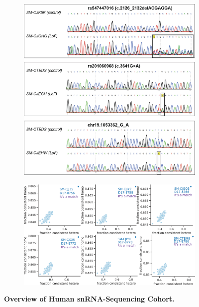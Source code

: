 \documentclass[12pt]{article}
\begin{document}
\begin{figure}[H]
\begin{subfigure}[t]{\textwidth}
    \end{subfigure}  
    \begin{subfigure}[t]{.5\textwidth}
        \caption{}
        \includegraphics[width=\textwidth]{./extended_plots/sanger_seq.png}        
    \end{subfigure}  
    \begin{subfigure}[t]{0.5\textwidth}
        \caption{}
        \includegraphics[width=\textwidth]{./extended_plots/sample_swap.png}        
    \end{subfigure}  
    \caption{
        \textbf{Overview of Human snRNA-Sequencing Cohort.}\\
    }
    \label{fig:snRNA_cohort}
\end{figure}
\end{document}

